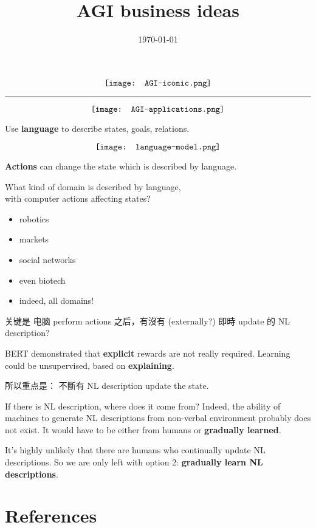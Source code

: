 \title{AGI business ideas}
\date{\today}
\maketitle

\begin{equation}
\vcenter{\hbox{\texttt{[image: AGI-iconic.png]}}}
\end{equation}


\begin{center}
	\rule{0.8\textwidth}{1pt}
\end{center}

\begin{equation}
\vcenter{\hbox{\texttt{[image: AGI-applications.png]}}}
\end{equation}

Use \textbf{language} to describe states, goals, relations.

\begin{equation}
\vcenter{\hbox{\texttt{[image: language-model.png]}}}
\end{equation}

\textbf{Actions} can change the state which is described by language.

What kind of domain is described by language, \\
with computer actions affecting states?
\begin{itemize}
\item robotics
\item markets
\item social networks
\item even biotech
\item indeed, all domains!
\end{itemize}

关键是 电脑 perform actions 之后，有沒有 (externally?) 即時 update 的 NL description?

BERT demonstrated that \textbf{explicit} rewards are not really required.  Learning could be unsupervised, based on \textbf{explaining}.

所以重点是： 不斷有 NL description update the state.

If there is NL description, where does it come from?  Indeed, the ability of machines to generate NL descriptions from non-verbal environment probably does not exist.  It would have to be either from humans or \textbf{gradually learned}.

It's highly unlikely that there are humans who continually update NL descriptions.  So we are only left with option 2:  \textbf{gradually learn NL descriptions}.



\section*{References}

 
